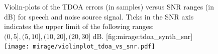

\begin{figure}[h]
    \begin{sidecaption}[]{
        Violin-plots of the TDOA errors (in samples) versus SNR ranges (in dB) for speech and noise source signal. Ticks in the SNR axis indicates the upper limit of the following ranges: $(0,5], (5,10], (10,20], (20,30]$ dB.
    }[fig:mirage:tdoa_synth_snr]
    \centering
    \texttt{[image: mirage/violinplot\_tdoa\_vs\_snr.pdf]}
    \end{sidecaption}
\end{figure}

